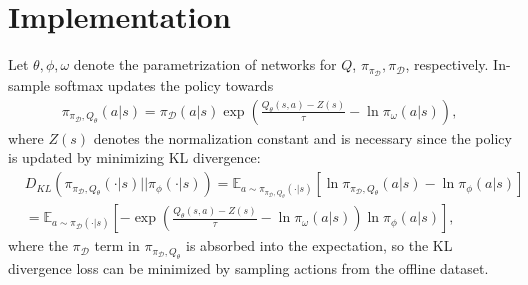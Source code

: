 \documentclass{article}
\newcommand{\AdaBracket}[1]{\left(#1\right)}
\newcommand{\AdaRectBracket}[1]{\left[#1\right]}
\newcommand{\expectation}[2]{\mathbb{E}_{#1}\AdaRectBracket{#2}}
\newcommand{\KLany}[2]{D_{\!K\!L}\!\left(#1 \left|  \right| #2 \right)}
\newcommand{\datasetPolicy}{\pi_{\mathcal{D}}}
\begin{document}
\section{Implementation}

Let $\theta, \phi, \omega$ denote the parametrization of networks for $Q$, $\pi_{\datasetPolicy}, \datasetPolicy$, respectively.
In-sample softmax updates the policy towards 
\begin{align}
    \pi_{\datasetPolicy, Q_{\theta}}(a|s) = \datasetPolicy(a|s)\exp\AdaBracket{\frac{Q_{\theta}(s,a) - Z(s)}{\tau} - \ln \pi_{\omega}(a|s)},
    \label{eq:insample_policy}
\end{align}
where $Z(s)$ denotes the normalization constant and is necessary since the policy is updated by minimizing KL divergence:
\begin{align*}
    &\KLany{\pi_{\datasetPolicy, Q_{\theta}}(\cdot|s)}{\pi_{\phi}(\cdot | s)} = \expectation{a \sim \pi_{\datasetPolicy, Q_{\theta}}(\cdot|s) }{\ln \pi_{\datasetPolicy, Q_{\theta}}(a|s) - \ln \pi_{\phi}(a | s)} \\
    &= \expectation{a \sim \datasetPolicy(\cdot|s)}{ - \exp\AdaBracket{\frac{Q_{\theta}(s,a) - Z(s)}{\tau} - \ln \pi_{\omega}(a|s)} \ln\pi_{\phi}(a|s) },
\end{align*} 
where the $\datasetPolicy$ term in $ \pi_{\datasetPolicy, Q_{\theta}}$ is absorbed into the expectation, so the KL divergence loss can be minimized by sampling actions from the offline dataset.
\end{document}
